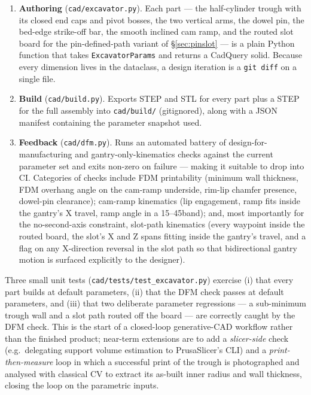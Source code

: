 \documentclass[11pt,a4paper]{article}
\begin{document}
\begin{enumerate}
  \item \textbf{Authoring} (\texttt{cad/excavator.py}). Each part --- the
    half-cylinder trough with its closed end caps and pivot bosses, the
    two vertical arms, the dowel pin, the bed-edge strike-off bar, the
    smooth inclined cam ramp, and the routed slot board for the
    pin-defined-path variant of \S\ref{sec:pinslot} --- is a plain Python
    function that takes \texttt{ExcavatorParams} and returns a CadQuery
    solid. Because every dimension lives in the dataclass, a design
    iteration is a \texttt{git diff} on a single file.
  \item \textbf{Build} (\texttt{cad/build.py}). Exports STEP and STL for
    every part plus a STEP for the full assembly into \texttt{cad/build/}
    (gitignored), along with a JSON manifest containing the parameter
    snapshot used.
  \item \textbf{Feedback} (\texttt{cad/dfm.py}). Runs an automated battery
    of design-for-manufacturing and gantry-only-kinematics checks against
    the current parameter set and exits non-zero on failure --- making it
    suitable to drop into CI. Categories of checks include FDM
    printability (minimum wall thickness, FDM overhang angle on the
    cam-ramp underside, rim-lip chamfer presence, dowel-pin clearance);
    cam-ramp kinematics (lip engagement, ramp fits inside the gantry's
    X travel, ramp angle in a 15--45\textdegree band); and, most
    importantly for the no-second-axis constraint, slot-path kinematics
    (every waypoint inside the routed board, the slot's X and Z spans
    fitting inside the gantry's travel, and a flag on any X-direction
    reversal in the slot path so that bidirectional gantry motion is
    surfaced explicitly to the designer).
\end{enumerate}

Three small unit tests (\texttt{cad/tests/test\_excavator.py}) exercise (i)
that every part builds at default parameters, (ii) that the DFM check
passes at default parameters, and (iii) that two deliberate parameter
regressions --- a sub-minimum trough wall and a slot path routed off the
board --- are correctly caught by the DFM check. This is the start of a
closed-loop generative-CAD workflow rather than the finished product;
near-term extensions are to add a \emph{slicer-side} check
(e.g.\ delegating support volume estimation to PrusaSlicer's CLI) and a
\emph{print-then-measure} loop in which a successful print of the trough
is photographed and analysed with classical CV to extract its as-built
inner radius and wall thickness, closing the loop on the parametric
inputs.



\label{sec:references}
\end{document}
